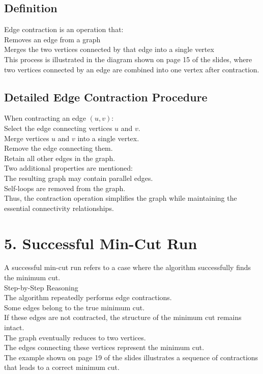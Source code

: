 \documentclass{article}
\begin{document}
\subsection{Definition}
Edge contraction is an operation that: \\
Removes an edge from a graph \\
Merges the two vertices connected by that edge into a single vertex \\
This process is illustrated in the diagram shown on page 15 of the slides, where two vertices connected by an edge are combined into one vertex after contraction.

\subsection{Detailed Edge Contraction Procedure}
When contracting an edge $(u,v)$: \\
Select the edge connecting vertices $u$ and $v$. \\
Merge vertices $u$ and $v$ into a single vertex. \\
Remove the edge connecting them. \\
Retain all other edges in the graph. \\
Two additional properties are mentioned: \\
The resulting graph may contain parallel edges. \\
Self-loops are removed from the graph. \\
Thus, the contraction operation simplifies the graph while maintaining the essential connectivity relationships.

\section{5. Successful Min-Cut Run}
A successful min-cut run refers to a case where the algorithm successfully finds the minimum cut. \\
Step-by-Step Reasoning \\
The algorithm repeatedly performs edge contractions. \\
Some edges belong to the true minimum cut. \\
If these edges are not contracted, the structure of the minimum cut remains intact. \\
The graph eventually reduces to two vertices. \\
The edges connecting these vertices represent the minimum cut. \\
The example shown on page 19 of the slides illustrates a sequence of contractions that leads to a correct minimum cut.
\end{document}
